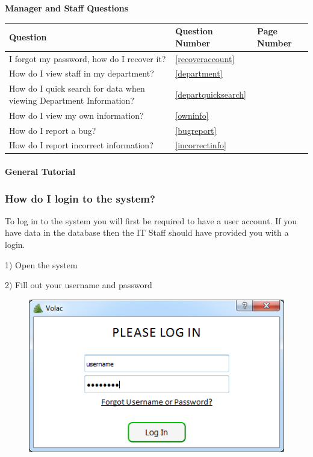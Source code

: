 \textbf{Manager and Staff Questions}

\begin{center}
    \begin{longtable}{|p{5cm}|p{2cm}|p{2cm}|}
        \hline
        \textbf{Question} & \textbf{Question Number} & \textbf{Page Number} \\ \hline
I forgot my password, how do I recover it? & \ref{recoveraccount} & \pageref{recoveraccount}\\ \hline
How do I view staff in my department? & \ref{department} & \pageref{department}\\ \hline
How do I quick search for data when viewing Department Information? & \ref{departquicksearch} & \pageref{departquicksearch}\\ \hline
How do I view my own information?  & \ref{owninfo} & \pageref{owninfo}\\ \hline
How do I report a bug? & \ref{bugreport} & \pageref{bugreport}\\ \hline
How do I report incorrect information? & \ref{incorrectinfo} & \pageref{incorrectinfo}\\ \hline

	\end{longtable}
\end{center}

\paragraph{General Tutorial}

\subsubsection{How do I login to the system?}\label{howlogin}

To log in to the system you will first be required to have a user account. If you have data in the database then the IT Staff should have provided you with a login.

1) Open the system

2) Fill out your username and password

\begin{figure}[H]
    \includegraphics[width=\textwidth]{./Manual/Images/login1.png}
\end{figure}

